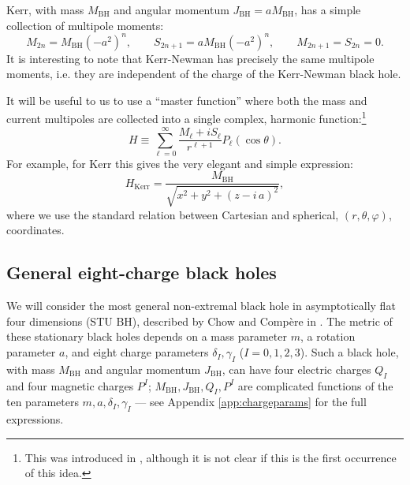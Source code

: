 \documentclass[12pt,a4paper]{article}
\newcommand{\be}{\begin{equation}}
\newcommand{\ee}{\end{equation}}
\begin{document}
Kerr, with mass $M_\text{BH}$ and angular momentum $J_\text{BH}=a M_\text{BH}$, has a simple collection of multipole moments:
\be M_{2n} = M_\text{BH}(-a^2)^n, \qquad S_{2n+1} = aM_\text{BH}(-a^2)^n, \qquad M_{2n+1}=S_{2n}=0.\ee
It is interesting to note that Kerr-Newman has precisely the same multipole moments, i.e. they are independent of the charge of the Kerr-Newman black hole.

It will be useful to us to use a ``master function'' where both the mass and current multipoles are collected into a single complex, harmonic function:\footnote{This was introduced in \cite{Bianchi:2020bxa}, although it is not clear if this is the first occurrence of this idea.}
\be H \equiv \sum_{\ell=0}^\infty \frac{M_\ell + i S_\ell}{r^{\ell+1}}P_{\ell}(\cos\theta).\ee
For example, for Kerr this gives the very elegant and simple expression:
\be H_{\text{Kerr}} = \frac{M_\text{BH}}{\sqrt{x^2+y^2+(z-i\, a)^2}} ,\ee
where we use the standard relation between Cartesian and spherical, $(r,\theta,\varphi)$, coordinates.




\subsection{General eight-charge black holes}\label{sec:genBH}
We will consider the most general non-extremal black hole in asymptotically flat four dimensions (STU BH), described by Chow and Comp\`ere in \cite{Chow:2014cca}. The metric of these stationary black holes depends on a mass parameter $m$, a rotation parameter $a$, and eight charge parameters $\delta_I,\gamma_I$ ($I=0,1,2,3$). Such a black hole, with mass $M_\text{BH}$ and angular momentum $J_\text{BH}$, can have four electric charges $Q_I$ and four magnetic charges $P^I$; $M_\text{BH},J_\text{BH},Q_I,P^I$ are complicated functions of the ten parameters $m,a,\delta_I,\gamma_I$ --- see Appendix \ref{app:chargeparams} for the full expressions.
\end{document}
